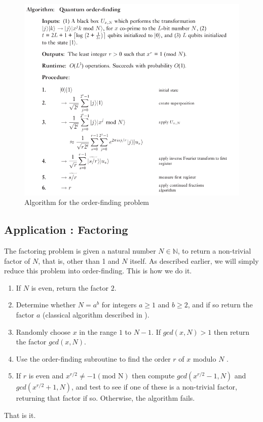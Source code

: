 \documentclass[conference]{IEEEtran}
\newcommand{\N}{\mathbb{N}}
\begin{document}
\begin{figure}[htbp]
\centerline{\includegraphics[scale = 0.3]{Images/order-summary.png}}
\caption{Algorithm for the order-finding problem}
\label{order-summ}
\end{figure}

\subsection{Application : Factoring}
The factoring problem is given a natural number $N \in \N$, to return a non-trivial factor of $N$, that is, other than 1 and $N$ itself.
As described earlier, we will simply reduce this problem into order-finding. This is how we do it. 
\begin{enumerate}
    \item If $N$ is even, return the factor $2$.
    \item Determine whether $N = a^b$ for integers $a \geq 1$ and $b \geq 2$, and if so
    return the factor $a$ (classical algorithm described in \cite{b6}).
    \item Randomly choose $x$ in the range $1$ to $N-1$. If $gcd(x, N) > 1$ then return
    the factor $gcd(x, N)$.
    \item Use the order-ﬁnding subroutine to ﬁnd the order $r$ of $x$ modulo $N$ .
    \item If $r$ is even and $x^{r/2} \neq - 1(\text{mod N})$ then compute $gcd(x^{r/2} - 1, N)$ and
    $gcd(x^{r/2} + 1, N)$, and test to see if one of these is a non-trivial factor,
    returning that factor if so. Otherwise, the algorithm fails.
\end{enumerate}
That is it. 
\end{document}
